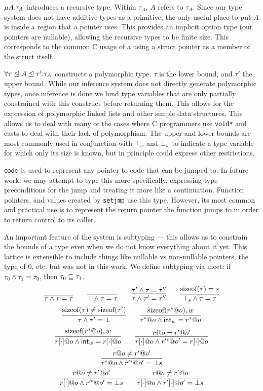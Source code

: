 $\mu A. \tau_A$ introduces a recursive type. Within $\tau_A$, $A$ refers to $\tau_A$. Since our type system does not have additive types as a primitive, the only useful place to put $A$ is inside a region that a pointer uses. This provides an implicit option type (our pointers are nullable), allowing the recursive types to be finite size. This corresponds to the common C usage of a using a struct pointer as a member of the struct itself.

$\forall \tau\mathrel{\unlhd} A\mathrel{\unlhd} \tau'.\tau_A$ constructs a polymorphic type. $\tau$ is the lower bound, and $\tau'$ the upper bound. While our inference system does not directly generate polymorphic types, once inference is done we bind type variables that are only partially constrained with this construct before returning them. This allows for the expression of polymorphic linked lists and other simple data structures. This allows us to deal with many of the cases where C programmers use \texttt{void*} and casts to deal with their lack of polymorphism. The upper and lower bounds are most commonly used in conjunction with $\top_{w}$ and $\bot_{w}$ to indicate a type variable for which only its size is known, but in principle could express other restrictions.

$\mathsf{code}$ is used to represent any pointer to code that can be jumped to. In future work, we may attempt to type this more specifically, expressing type preconditions for the jump and treating it more like a continuation. Function pointers, and values created by \texttt{setjmp} use this type. However, its most common and practical use is to represent the return pointer the function jumps to in order to return control to its caller.

An important feature of the system is subtyping --- this allows us to constrain the bounds of a type even when we do not know everything about it yet. This lattice is extensible to include things like nullable vs non-nullable pointers, the type of 0, etc. but was not in this work. We define subtyping via meet: if $\tau_0 \wedge \tau_1 = \tau_0$, then $\tau_0 \sqsubseteq \tau_1$.
\[
\infer{\tau \wedge \tau = \tau}{}
\qquad
\infer{\utop \wedge \tau = \tau}{}
\qquad
\infer{\tau \wedge \tau' = \tau''}{\tau' \wedge \tau = \tau''}
\qquad
\infer{\top_{s} \wedge \tau = \tau}{\textrm{sizeof}(\tau) = s}
\]
\[
\infer{\tau \wedge \tau' = \ubot}{\textrm{sizeof}(\tau) \neq \textrm{sizeof}(\tau')}
\qquad
\infer{\lptr{r}{o} \wedge \tint{w} = \lptr{r}{o}}{\textrm{sizeof}(\lptr{r}{o}), w}
\]
\[
\infer{\aptr{r}{o} \wedge \tint{w} = \aptr{r}{o}}{\textrm{sizeof}(\lptr{r}{o}), w}
\qquad
\infer{\aptr{r}{o} \wedge \lptr{r'}{o'} = \aptr{r}{o}}{r@o = r'@o'}
\]
\[
\infer{\lptr{r}{o} \wedge \lptr{r'}{o'} = \bot{s}}{r@o \neq r'@o'}
\]
\[
\infer{\aptr{r}{o} \wedge \lptr{r'}{o'} = \bot{s}}{r@o \neq r'@o'}
\qquad
\infer{\aptr{r}{o} \wedge \aptr{r'}{o'} = \bot{s}}{r@o \neq r'@o}
\]

